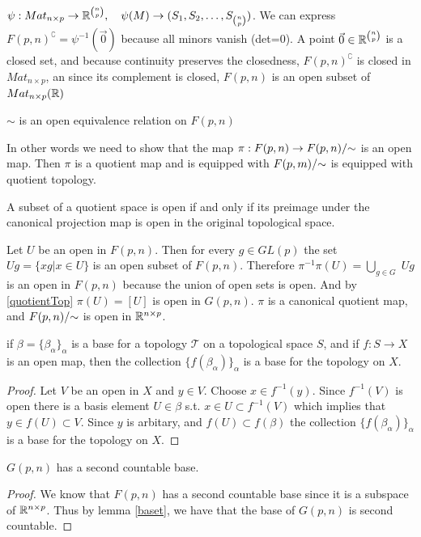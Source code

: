 \documentclass[11pt,a4paper]{report}
\begin{document}
$ \psi: Mat_{n \times p} \to \mathbb{R}^{ n \choose p}, \quad \psi(M) \to (S_1,S_2, \dots, S_{n \choose p})$.
We can express $F(p,n)^\complement = \psi ^{-1} ( \vec{0} )$ because all minors vanish (det=0).
A point $ \vec{0} \in \mathbb{R}^{n \choose p}$ is a closed set, and because continuity preserves the closedness, $F(p,n)^\complement$ is closed in $Mat_{n \times p}$,
an since its complement is closed, $F(p,n)$ is an open subset of $Mat_{n \times p}(\mathbb{R})$
\begin{Prop}
    $\sim$ is an open equivalence relation on $F(p,n)$
\end{Prop}
In other words we need to show that the map $\pi: F(p,n) \to F(p,n)/{\sim}$ is an open map.
Then $\pi$ is a quotient map and is equipped with $F(p,m)/{\sim}$ is equipped with quotient topology.
\newline
\begin{Lemma} \label{quotientTop}
    A subset of a quotient space is open if and only if its
    preimage under the canonical projection map is open in the original topological space.
\end{Lemma}
Let $U$ be an open in $F(p,n)$. Then for every $g \in GL(p)$ the set $U g = \{ x g | x \in U \}$ is an open subset of $F(p,n)$.
Therefore $\pi^{-1}\pi(U) = \displaystyle \bigcup_{g \in G} \; U g$ is an open in $F(p,n)$ because the union of open sets is open.
And by \ref{quotientTop} $\pi(U) = [U]$ is open in $G(p,n)$. $\pi$ is a canonical quotient map, and $F(p,n)/{\sim}$ is open in $\mathbb{R}^{n \times p}$. 
\begin{Lemma}
    \label{baset}
    if $\beta = \{ \beta_\alpha \}_\alpha$ is a base for a topology $\mathcal{T}$ on a topological space $S$,
    and if $f: S \to X$ is an open map, then the collection $\{ f (\beta_\alpha) \}_\alpha$ is a base for the topology on $X$.
\end{Lemma}
\begin{proof} Let $V$ be an open in $X$ and $y \in V$. Choose $x \in f^{-1}(y)$. 
Since $f^{-1} (V)$ is open there is a basis element $U \in \beta$ s.t. $x \in U \subset f^{-1}(V)$
which implies that $y \in f(U) \subset V$. Since $y$ is arbitary, and $f(U) \subset f(\beta)$ the collection $\{ f (\beta_\alpha) \}_\alpha$ is a base for the topology on $X$.
\end{proof}
\begin{Prop}\label{secondCount}
    $G(p,n)$ has a second countable base.
\end{Prop}
\begin{proof}
We know that $F(p,n)$ has a second countable base since it is a subspace of $\mathbb{R}^{n \times p}$.
Thus by lemma \ref{baset}, we have that the base of $G(p,n)$ is second countable.
\end{proof}
\end{document}
